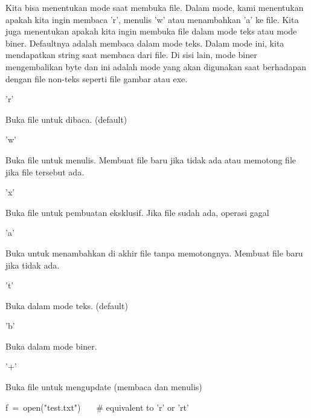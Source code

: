 \vspace{12pt}
Kita bisa menentukan mode saat membuka file. Dalam mode, kami menentukan apakah kita ingin membaca 'r', menulis 'w' atau menambahkan 'a' ke file. Kita juga menentukan apakah kita ingin membuka file dalam mode teks atau mode biner. Defaultnya adalah membaca dalam mode teks. Dalam mode ini, kita mendapatkan string saat membaca dari file. Di sisi lain, mode biner mengembalikan byte dan ini adalah mode yang akan digunakan saat berhadapan dengan file non-teks seperti file gambar atau exe. \par
\vspace{12pt}
\vspace{12pt}
\noindent 
'r' \hspace*{0.5in}  \par
\noindent 
Buka file untuk dibaca. (default) \par
\vspace{12pt}
\noindent 
'w' \hspace*{0.5in}  \par
\noindent 
Buka file untuk menulis. Membuat file baru jika tidak ada atau memotong file jika file tersebut ada. \par
\vspace{12pt}
\noindent 
'x' \hspace*{0.5in}  \par
\noindent 
Buka file untuk pembuatan eksklusif. Jika file sudah ada, operasi gagal \par
\vspace{12pt}
\noindent 
'a' \hspace*{0.5in}  \par
\noindent 
Buka untuk menambahkan di akhir file tanpa memotongnya. Membuat file baru jika tidak ada. \par
\vspace{12pt}
\noindent 
't' \hspace*{0.5in}  \par
\noindent 
Buka dalam mode teks. (default) \par
\vspace{12pt}
\noindent 
'b' \par
\noindent 
Buka dalam mode biner. \par
\vspace{12pt}
\noindent 
'+' \par
\noindent 
Buka file untuk mengupdate (membaca dan menulis) \par
\vspace{12pt}
\noindent 
f~=~open("test.txt")~~~    $  \#  $ equivalent to 'r' or 'rt' \par
